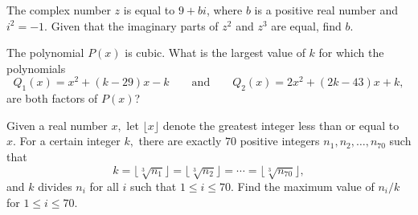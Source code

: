 \documentclass[11pt]{article}
\theoremstyle{definition}
\begin{document}
%	


















\begin{question}[name={2007 AIME I, \href{https://artofproblemsolving.com/community/c4p784537}{Problem 3}}]
	The complex number $z$ is equal to $9+bi$, where $b$ is a positive real number and $i^{2}=-1$. Given that the imaginary parts of $z^{2}$ and $z^{3}$ are equal, find $b$.	
\end{question}


%	













\begin{question}[name={2007 AIME I, \href{https://artofproblemsolving.com/community/c4p784590}{Problem 8}}]
	The polynomial $P(x)$ is cubic. What is the largest value of $k$ for which the polynomials $$Q_{1}(x) = x^{2}+(k-29)x-k \qquad \text{and} \qquad Q_{2}(x) = 2x^{2}+(2k-43)x+k,$$ are both factors of $P(x)$?
\end{question}


%	












\begin{question}[name={2007 AIME II, \href{https://artofproblemsolving.com/community/c4p784590}{Problem 7}}]
	Given a real number $x,$ let $\lfloor x \rfloor$ denote the greatest integer less than or equal to $x.$ For a certain integer $k,$ there are exactly $70$ positive integers $n_{1}, n_{2}, \ldots, n_{70}$ such that $$k=\lfloor\sqrt[3]{n_{1}}\rfloor = \lfloor\sqrt[3]{n_{2}}\rfloor = \cdots = \lfloor\sqrt[3]{n_{70}}\rfloor,$$ and $k$ divides $n_{i}$ for all $i$ such that $1 \leq i \leq 70$. Find the maximum value of ${n_{i}}/{k}$ for $1\leq i \leq 70$.
\end{question}
\end{document}

